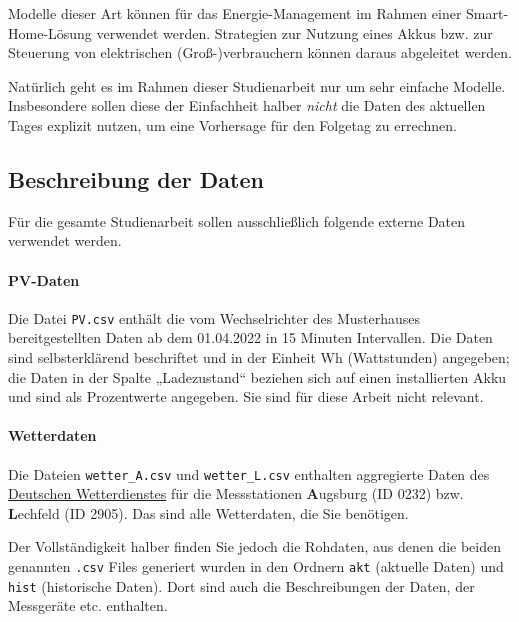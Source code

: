 \documentclass[11pt,a4paper]{article}
\begin{document}
Modelle dieser Art können für das Energie-Management im Rahmen einer Smart-Home-Lösung verwendet werden. Strategien zur Nutzung eines Akkus bzw. zur Steuerung von elektrischen (Groß-)verbrauchern können daraus abgeleitet werden.

Natürlich geht es im Rahmen dieser Studienarbeit nur um sehr einfache Modelle. Insbesondere sollen diese der Einfachheit halber \emph{nicht} die Daten des aktuellen Tages explizit nutzen, um eine Vorhersage für den Folgetag zu errechnen.

\subsection*{Beschreibung der Daten}
Für die gesamte Studienarbeit sollen ausschließlich folgende externe Daten verwendet werden.
\paragraph*{PV-Daten}
Die Datei \texttt{PV.csv} enthält die vom Wechselrichter des Musterhauses bereitgestellten Daten ab dem 01.04.2022 in 15 Minuten Intervallen. Die Daten sind selbsterklärend beschriftet und in der Einheit Wh (Wattstunden) angegeben; die Daten in der Spalte „Ladezustand“ beziehen sich auf einen installierten Akku und sind als Prozentwerte angegeben. Sie sind für diese Arbeit nicht relevant.

\paragraph*{Wetterdaten}
Die Dateien \texttt{wetter\_A.csv} und \texttt{wetter\_L.csv} enthalten aggregierte Daten des \href{https://opendata.dwd.de/climate_environment/CDC/observations_germany/}{Deutschen Wetterdienstes} für die Messstationen \textbf{A}ugsburg (ID 0232) bzw. \textbf{L}echfeld (ID 2905). Das sind alle Wetterdaten, die Sie benötigen.

Der Vollständigkeit halber finden Sie jedoch die Rohdaten, aus denen die beiden genannten \texttt{.csv} Files generiert wurden in den Ordnern \texttt{akt\/} (aktuelle Daten) und \texttt{hist\/} (historische Daten). Dort sind auch die Beschreibungen der Daten, der Messgeräte etc. enthalten.
\end{document}

